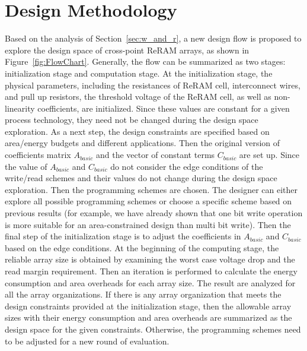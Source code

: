 \vspace{10pt}
\section{Design Methodology}\label{sec:framwork}
Based on the analysis of Section~\ref{sec:w_and_r}, a new design flow is proposed to explore the design space of cross-point ReRAM arrays, as shown in Figure~\ref{fig:FlowChart}. Generally, the flow can be summarized as two stages: initialization stage and computation stage. At the initialization stage, the physical parameters, including the resistances of ReRAM cell, interconnect wires, and pull up resistors, the threshold voltage of the ReRAM cell, as well as non-linearity coefficients, are initialized. Since these values are constant for a given process technology, they need not be changed during the design space exploration. As a next step, the design constraints are specified based on area/energy budgets and different applications. Then the  original version of coefficients matrix $A_{basic}$ and the vector of constant terms $C_{basic}$ are set up. Since the value of $A_{basic}$ and $C_{basic}$ do not consider the edge conditions of the write/read schemes and their values do not change during the design space exploration. Then the programming schemes are chosen. The designer can either explore all possible programming schemes or choose a specific scheme based on previous results (for example, we have already shown that one bit write operation is more suitable for an area-constrained design than multi bit write). Then the final step of the initialization stage is to adjust the coefficients in $A_{basic}$ and $C_{basic}$ based on the edge conditions. At the beginning of the computing stage, the reliable array size is obtained by examining the worst case voltage drop and the read margin requirement. Then an iteration is performed to calculate the energy consumption and area overheads for each array size. The result are analyzed for all the array organizations. If there is any array organization that meets the design constraints provided at  the initialization stage, then the allowable array sizes with their energy consumption and area overheads are summarized as the design space for the given constraints. Otherwise, the programming schemes need to be adjusted for a new round of evaluation.



